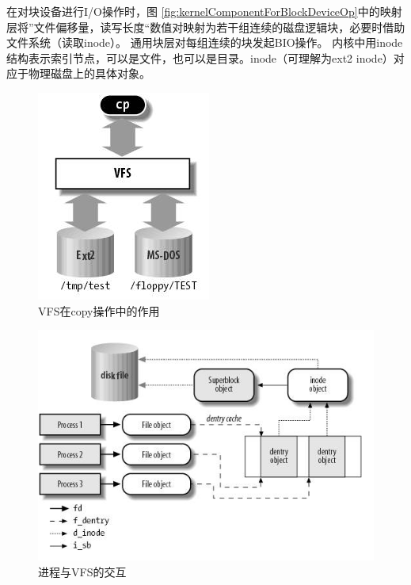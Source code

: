 在对块设备进行I/O操作时，图 \ref{fig:kernelComponentForBlockDeviceOp}中的映射层将”文件偏移量，读写长度“数值对映射为若干组连续的磁盘逻辑块，必要时借助文件系统（读取inode）。
通用块层对每组连续的块发起BIO操作。
内核中用inode结构表示索引节点，可以是文件，也可以是目录。inode（可理解为ext2 inode）对应于物理磁盘上的具体对象。


\begin{figure}[ht]
	\begin{center}
		\includegraphics[keepaspectratio,width=0.15\paperwidth]{Pictures/Kernel/VirtualFileSystem.png}
	\caption{VFS在copy操作中的作用}
	\label{fig:VirtualFileSystem}
	\end{center}
\end{figure}


\begin{figure}[ht]
	\begin{center}
		\includegraphics[keepaspectratio,width=0.4\paperwidth]{Pictures/Kernel/LinuxProcessAndVFS.png}
	\caption{进程与VFS的交互}
	\label{fig:LinuxProcessAndVFS}
	\end{center}
\end{figure}

